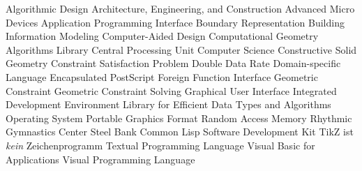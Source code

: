 \begin{acronym}[SO-DIMM]
       {Algorithmic Design}
      {Architecture, Engineering, and Construction}
      {Advanced Micro Devices}
      {Application Programming Interface}
    {Boundary Representation}
      {Building Information Modeling}
      {Computer-Aided Design}
     {Computational Geometry Algorithms Library}
      {Central Processing Unit}
       {Computer Science}
      {Constructive Solid Geometry}
      {Constraint Satisfaction Problem}
      {Double Data Rate}
      {Domain-specific Language}
      {Encapsulated PostScript}
      {Foreign Function Interface}
       {Geometric Constraint}
      {Geometric Constraint Solving}
      {Graphical User Interface}
      {Integrated Development Environment}
     {Library for Efficient Data Types and Algorithms}
       {Operating System}
      {Portable Graphics Format}
      {Random Access Memory}
      {Rhythmic Gymnastics Center}
     {Steel Bank Common Lisp}
      {Software Development Kit}
     {TikZ ist \textit{kein} Zeichenprogramm}
      {Textual Programming Language}
      {Visual Basic for Applications}
      {Visual Programming Language}
\end{acronym}
